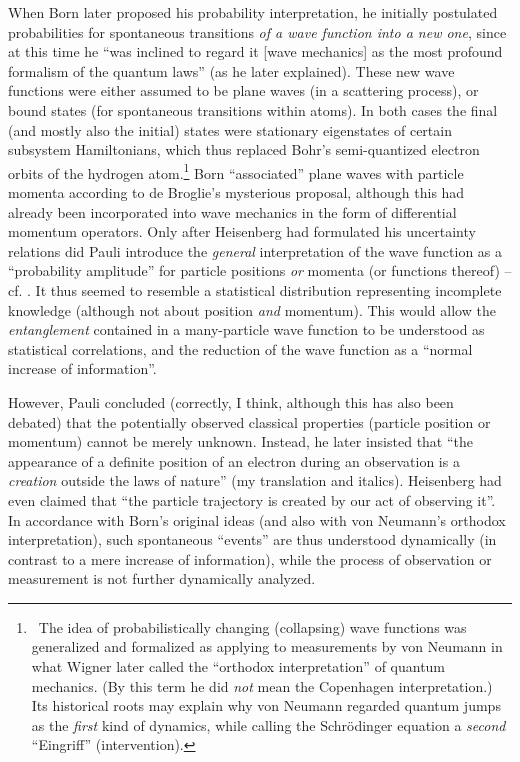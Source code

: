 \documentclass[12pt]{article}
\newcommand{\ts}{\hspace{3pt}}
\begin{document}
When Born later proposed his probability
interpretation, he initially postulated probabilities for
spontaneous transitions {\it of a wave function into a new one}, since
at this time he ``was inclined to regard it [wave mechanics] as the
most profound formalism of the quantum laws'' (as he later explained).
These new wave functions were either assumed  to be plane waves (in a
scattering process), or bound states (for
spontaneous transitions within atoms). In both cases the
final (and mostly also the initial) states were stationary eigenstates
of certain subsystem Hamiltonians, which thus replaced Bohr's
semi-quantized electron orbits of the hydrogen atom.\footnote{\ The
idea of probabilistically changing (collapsing) wave functions was
generalized and formalized as applying to measurements by von Neumann
in what Wigner later called the ``orthodox interpretation'' of quantum
mechanics. (By this term he did {\it not} mean the Copenhagen
interpretation.) Its historical roots may explain why
von Neumann regarded quantum jumps as the {\it first} kind of
dynamics, while calling the Schr\"odinger equation a {\it
second} ``Eingriff'' (intervention).}   Born ``associated'' plane waves
with particle momenta according to de Broglie's mysterious proposal,
although this had already been incorporated into wave mechanics in the
form of differential momentum operators. Only after Heisenberg had
formulated his uncertainty relations did Pauli introduce the {\it
general} interpretation of the wave function as a ``probability
amplitude'' for particle positions {\it or} momenta (or functions
thereof) -- cf.\ts
\cite{Beller}. It thus seemed to resemble a statistical
distribution representing incomplete knowledge (although not about
position {\it and} momentum). This
would allow the {\it entanglement} contained in a many-particle
wave function to be understood as statistical correlations, and the
reduction of the wave function as a ``normal increase of
information''.

However, Pauli concluded (correctly, I think, although this has also
been debated) that the potentially observed classical properties
(particle position or momentum) cannot be merely unknown. Instead, he
later insisted
\cite{Pauli} that ``the appearance of a
definite position of an electron during an observation is a {\it
creation} outside the laws of nature'' (my translation and italics).
Heisenberg had even claimed that ``the particle trajectory is created
by our act of observing it''. In accordance with Born's original ideas
(and also with von Neumann's orthodox interpretation), such spontaneous
``events'' are thus understood dynamically (in contrast to a mere
increase of information), while the process of observation or
measurement is not further dynamically analyzed.
\end{document}
